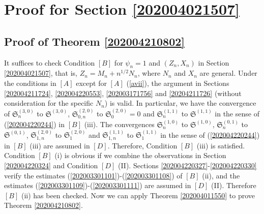 \documentclass[a4paper,12pt]{article}
\numberwithin{equation}{section}
\numberwithin{equation}{section}
\begin{document}
\section{Proof for Section \ref{202004021507}}\label{202004270654}
\subsection{Proof of Theorem \ref{202004210802}}\label{202004210757}
It suffices to check Condition $[B]$ for $\psi_n=1$ and $(Z_n,X_n)$ in Section \ref{202004021507}, 
that is, $Z_n=M_n+n^{1/2}N_n$, where $N_n$ and $X_n$ are general. 
%
Under the conditions in $[A]$ except for $[A]$ (\ref{avii}), 
the argument in Sections \ref{202004211724}, \ref{202004220553}, \ref{202003171756} and \ref{20204211726} 
(without consideration for the specific $N_n$) 
is valid. In particular, we have the convergence of 
${\mathfrak S}_n^{(3,0)}$ to ${\mathfrak S}^{(3,0)}$, 
${\mathfrak S}_{0,n}^{(2,0)}$ to ${\mathfrak S}_0^{(2,0)}=0$ 
and 
${\mathfrak S}_n^{(1,1)}$ to ${\mathfrak S}^{(1,1)}$ 
in the sense of (\ref{202004220244}) in $[B]$ (iii). 
The convergences 
${\mathfrak S}_n^{(1,0)}$ to ${\mathfrak S}^{(1,0)}$, 
${\mathfrak S}_n^{(0,1)}$ to ${\mathfrak S}^{(0,1)}$, 
${\mathfrak S}_{1,n}^{(2,0)}$ to ${\mathfrak S}_1^{(2,0)}$ 
and
${\mathfrak S}_{1,n}^{(1,1)}$ to ${\mathfrak S}_1^{(1,1)}$ 
in the sense of (\ref{202004220244}) in $[B]$ (iii) 
are assumed in $[D]$. 
Therefore, Condition $[B]$ (iii) is satisfied. 
%
Condition $[B]$ (i) is obvious if we combine the observations in Section \ref{202004220324} and 
Condition $[D]$ (II). 
%
Sections \ref{202004220327}-\ref{202004220330} verify 
the estimates (\ref{202003301101})-(\ref{202003301108}) of $[B]$ (ii), 
and the estimates (\ref{202003301109})-(\ref{202003301111}) are assumed in $[D]$ (II). 
Therefore $[B]$ (ii) has been checked. 
Now we can apply Theorem \ref{202004011550} to prove Theorem \ref{202004210802}. 
\end{document}
